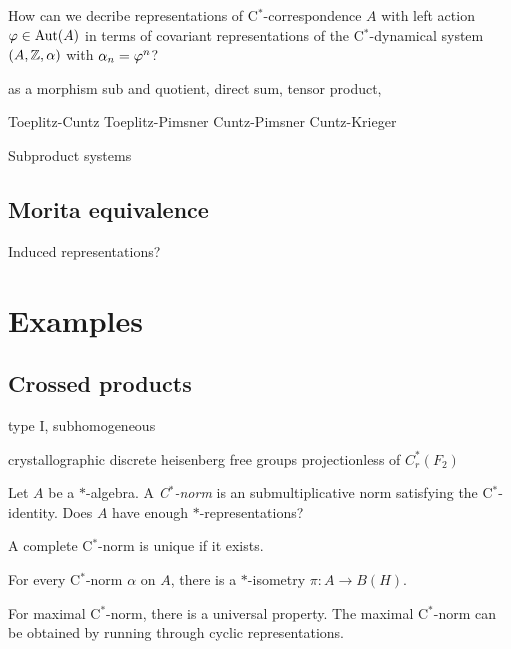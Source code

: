 \documentclass{../../large}
\begin{document}
How can we decribe representations of C$^*$-correspondence $A$ with left action $\varphi\in\operatorname{Aut}(A)$ in terms of covariant representations of the C$^*$-dynamical system $(A,\mathbb{Z},\alpha)$ with $\alpha_n=\varphi^n$?



as a morphism
sub and quotient, direct sum, tensor product,

Toeplitz-Cuntz
Toeplitz-Pimsner
Cuntz-Pimsner
Cuntz-Krieger



Subproduct systems


\section{Morita equivalence}



Induced representations?







\chapter{Examples}



\section{Crossed products}


\begin{prb}
\end{prb}



type I, subhomogeneous


crystallographic
discrete heisenberg
free groups
projectionless of $C_r^*(F_2)$



\begin{prb}
Let $A$ be a $*$-algebra.
A \emph{C$^*$-norm} is an submultiplicative norm satisfying the C$^*$-identity.
Does $A$ have enough $*$-representations?
\begin{parts}
\item A complete C$^*$-norm is unique if it exists.
\item For every C$^*$-norm $\alpha$ on $A$, there is a $*$-isometry $\pi:A\to B(H)$.
\item For maximal C$^*$-norm, there is a universal property. The maximal C$^*$-norm can be obtained by running through cyclic representations.
\end{parts}
\end{prb}
\end{document}
